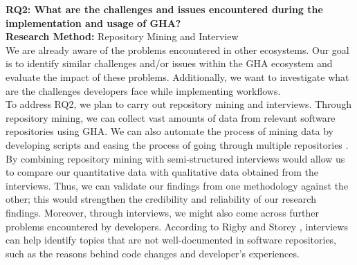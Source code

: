 \documentclass[conference]{IEEEtran}
\begin{document}
        \textbf{RQ2: What are the challenges and issues encountered during the implementation and usage of GHA?}\\

        \textbf{Research Method:} Repository Mining and Interview\\

        We are already aware of the problems encountered in other ecosystems. Our goal is to identify similar challenges and/or issues within the GHA ecosystem and evaluate the impact of these problems. Additionally, we want to investigate what are the challenges developers face while implementing workflows.\\

       To address RQ2, we plan to carry out repository mining and interviews. Through repository mining, we can collect vast amounts of data from relevant software repositories using GHA. We can also automate the process of mining data by developing scripts and easing the process of going through multiple repositories \cite{chaturvedi2013tools}. By combining repository mining with semi-structured interviews would allow us to compare our quantitative data with qualitative data obtained from the interviews. Thus, we can validate our findings from one methodology against the other; this would strengthen the credibility and reliability of our research findings. Moreover, through interviews, we might also come across further problems encountered by developers. According to Rigby and Storey \cite{rigby2013understanding}, interviews can help identify topics that are not well-documented in software repositories, such as the reasons behind code changes and developer’s experiences.\\
\end{document}
